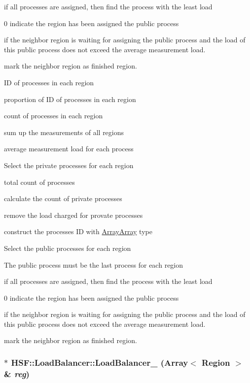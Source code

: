 if all processes are assigned, then find the process with the least load

0 indicate the region has been assigned the public process

if the neighbor region is waiting for assigning the public process and the load of this public process does not exceed the average measurement load.

mark the neighbor region as finished region.

ID of processes in each region

proportion of ID of processes in each region

count of processes in each region

sum up the measurements of all regions

average measurement load for each process

Select the private processes for each region

total count of processes

calculate the count of private processes

remove the load charged for provate processes

construct the processes ID with \hyperlink{classHSF_1_1ArrayArray}{ArrayArray} type

Select the public processes for each region

The public process must be the last process for each region

if all processes are assigned, then find the process with the least load

0 indicate the region has been assigned the public process

if the neighbor region is waiting for assigning the public process and the load of this public process does not exceed the average measurement load.

mark the neighbor region as finished region. \hypertarget{classHSF_1_1LoadBalancer_a9c6357abc32209101f62d07846cf8cff}{
\subsubsection[{LoadBalancer\_\-3}]{$\ast$ HSF::LoadBalancer::LoadBalancer\_ (Array$<$ {\bf Region} $>$ \& {\em reg})}}
\label{classHSF_1_1LoadBalancer_a9c6357abc32209101f62d07846cf8cff}


